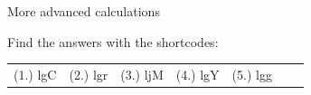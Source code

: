 \begin{exercises}{  More advanced calculations }
\begin{enumerate}[noitemsep, label=\textbf{\arabic*}. ]
\end{enumerate}
  \label{m38717**end}
\par {} Find the answers with the shortcodes:
 \par \begin{tabular}[h]{cccccc}
 (1.) lgC  &  (2.) lgr  &  (3.) ljM  &  (4.) lgY  &  (5.) lgg  &    &   & \end{tabular}
\end{exercises}
